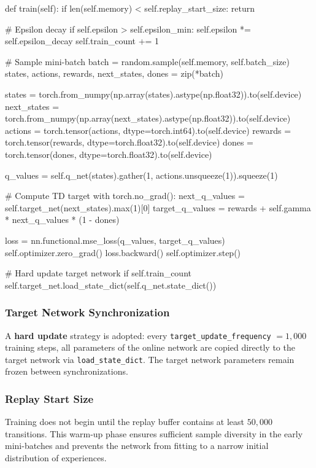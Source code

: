 \documentclass[12pt,a4paper]{report}
\begin{document}
\begin{pycode}
def train(self):
    if len(self.memory) < self.replay_start_size:
        return

    # Epsilon decay
    if self.epsilon > self.epsilon_min:
        self.epsilon *= self.epsilon_decay
    self.train_count += 1

    # Sample mini-batch
    batch = random.sample(self.memory, self.batch_size)
    states, actions, rewards, next_states, dones = zip(*batch)

    states      = torch.from_numpy(np.array(states).astype(np.float32)).to(self.device)
    next_states = torch.from_numpy(np.array(next_states).astype(np.float32)).to(self.device)
    actions     = torch.tensor(actions, dtype=torch.int64).to(self.device)
    rewards     = torch.tensor(rewards, dtype=torch.float32).to(self.device)
    dones       = torch.tensor(dones,   dtype=torch.float32).to(self.device)

    q_values = self.q_net(states).gather(1, actions.unsqueeze(1)).squeeze(1)

    # Compute TD target
    with torch.no_grad():
        next_q_values   = self.target_net(next_states).max(1)[0]
        target_q_values = rewards + self.gamma * next_q_values * (1 - dones)

    loss = nn.functional.mse_loss(q_values, target_q_values)
    self.optimizer.zero_grad()
    loss.backward()
    self.optimizer.step()

    # Hard update target network
    if self.train_count %
        self.target_net.load_state_dict(self.q_net.state_dict())
\end{pycode}

\subsubsection*{Target Network Synchronization}

A \textbf{hard update} strategy is adopted: every
\texttt{target\_update\_frequency} $= 1{,}000$ training steps,
all parameters of the online network are copied directly to the target network via
\texttt{load\_state\_dict}.
The target network parameters remain frozen between synchronizations.

\subsubsection*{Replay Start Size}

Training does not begin until the replay buffer contains at least $50{,}000$ transitions.
This warm-up phase ensures sufficient sample diversity in the early mini-batches
and prevents the network from fitting to a narrow initial distribution of experiences.
\end{document}
